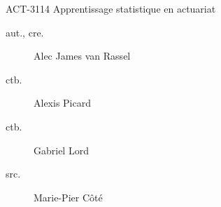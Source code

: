 \begin{contrib}{ACT-3114\: Apprentissage statistique en actuariat}
\begin{description}
	\item[aut., cre.] Alec James van Rassel
	\item[ctb.]	Alexis Picard
	\item[ctb.]	Gabriel Lord
	\item[src.] Marie-Pier Côté
\end{description}
\end{contrib}